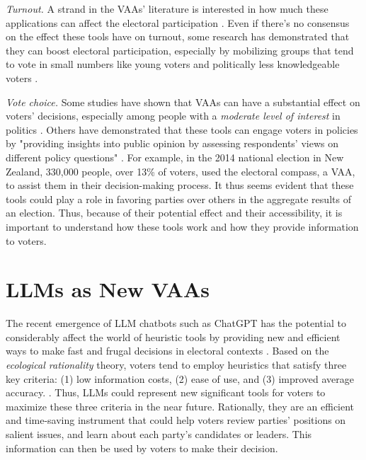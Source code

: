 \documentclass{article}
\begin{document}
\textit{Turnout.} A strand in the VAAs' literature is interested in how much these applications can affect the electoral participation \parencite{germann_gemenis19, stadelmann-steffen_etal22}. Even if there's no consensus on the effect these tools have on turnout, some research has demonstrated that they can boost electoral participation, especially by mobilizing groups that tend to vote in small numbers like young voters and politically less knowledgeable voters \parencite{gemenis_rosema14}.

\textit{Vote choice.} Some studies have shown that VAAs can have a substantial effect on voters' decisions, especially among people with a \textit{moderate level of interest} in politics \parencite{tromborg_albertsen23}. Others have demonstrated that these tools can engage voters in policies by "providing insights into public opinion by assessing respondents' views on different policy questions" \parencite{lees-marshment_etal15}. For example, in the 2014 national election in New Zealand, 330,000 people, over 13\% of voters, used the electoral compass, a VAA, to assist them in their decision-making process. It thus seems evident that these tools could play a role in favoring parties over others in the aggregate results of an election. Thus, because of their potential effect and their accessibility, it is important to understand how these tools work and how they provide information to voters.

\section{LLMs as New VAAs}
The recent emergence of LLM chatbots such as ChatGPT has the potential to considerably affect the world of heuristic tools by providing new and efficient ways to make fast and frugal decisions in electoral contexts \parencite{kim_lee23}. Based on the \textit{ecological rationality} theory, voters tend to employ heuristics that satisfy three key criteria: (1) low information costs, (2) ease of use, and (3) improved average accuracy. \parencite{tromborg_albertsen23}. Thus, LLMs could represent new significant tools for voters to maximize these three criteria in the near future. Rationally, they are an efficient and time-saving instrument that could help voters review parties' positions on salient issues, and learn about each party's candidates or leaders. This information can then be used by voters to make their decision. \par
\end{document}
